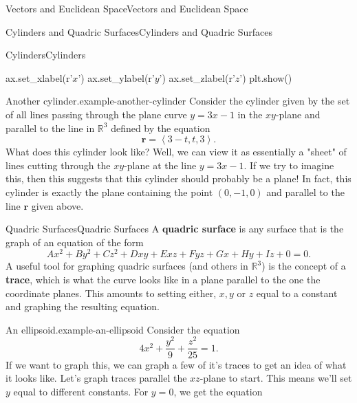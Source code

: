 \documentclass[10pt,]{book}
\newcommand{\terminology}[1]{\textbf{#1}}
\numberwithin{equation}{section}
\newcommand{\RR}{\mathbb{R}}
\newcommand{\vv}[1]{\mathbf{#1}}
\newcommand{\dotprod}[1]{\left\langle #1 \right\rangle}
\begin{document}
\begin{chapterptx}{Vectors and Euclidean Space}{}{Vectors and Euclidean Space}{}{}
\begin{sectionptx}{Cylinders and Quadric Surfaces}{}{Cylinders and Quadric Surfaces}{}{}
\begin{subsectionptx}{Cylinders}{}{Cylinders}{}{}
\begin{sageinput}
ax.set_xlabel(r'$x$')
ax.set_ylabel(r'$y$')
ax.set_zlabel(r'$z$')
plt.show()
\end{sageinput}
\begin{example}{Another cylinder.}{example-another-cylinder}%
\hypertarget{p-1022}{}%
Consider the cylinder given by the set of all lines passing through the plane curve \(y = 3x-1\) in the \(xy\)-plane and parallel to the line in \(\RR^{3}\) defined by the equation%
%
\begin{equation*}
\vv{r} = \dotprod{3-t,t,3}.
\end{equation*}
\hypertarget{p-1023}{}%
What does this cylinder look like? Well, we can view it as essentially a "sheet" of lines cutting through the \(xy\)-plane at the line \(y = 3x-1\). If we try to imagine this, then this suggests that this cylinder should probably be a plane! In fact, this cylinder is exactly the plane containing the point \((0,-1,0)\) and parallel to the line \(\vv{r}\) given above.%
\end{example}
\end{subsectionptx}
%
%
\typeout{************************************************}
\typeout{************************************************}
%
\begin{subsectionptx}{Quadric Surfaces}{}{Quadric Surfaces}{}{}\label{subsection-quadric-surfaces}
\hypertarget{p-1024}{}%
A \terminology{quadric surface} is any surface that is the graph of an equation of the form%
%
\begin{equation*}
Ax^{2}+By^{2}+Cz^{2}+Dxy+Exz+Fyz+Gx+Hy+Iz+0 = 0.
\end{equation*}
\hypertarget{p-1025}{}%
A useful tool for graphing quadric surfaces (and others in \(\RR^{3}\)) is the concept of a \terminology{trace}, which is what the curve looks like in a plane parallel to the one the coordinate planes. This amounts to setting either, \(x,y\) or \(z\) equal to a constant and graphing the resulting equation.%
\begin{example}{An ellipsoid.}{example-an-ellipsoid}%
\hypertarget{p-1026}{}%
Consider the equation%
%
\begin{equation*}
4x^{2}+\frac{y^{2}}{9}+\frac{z^{2}}{25} = 1.
\end{equation*}
\hypertarget{p-1027}{}%
If we want to graph this, we can graph a few of it's traces to get an idea of what it looks like. Let's graph traces parallel the \(xz\)-plane to start. This means we'll set \(y\) equal to different constants. For \(y=0\), we get the equation%
%
\begin{equation*}

\end{equation*}
\end{example}
\end{subsectionptx}
\end{sectionptx}
\end{chapterptx}
\end{document}
